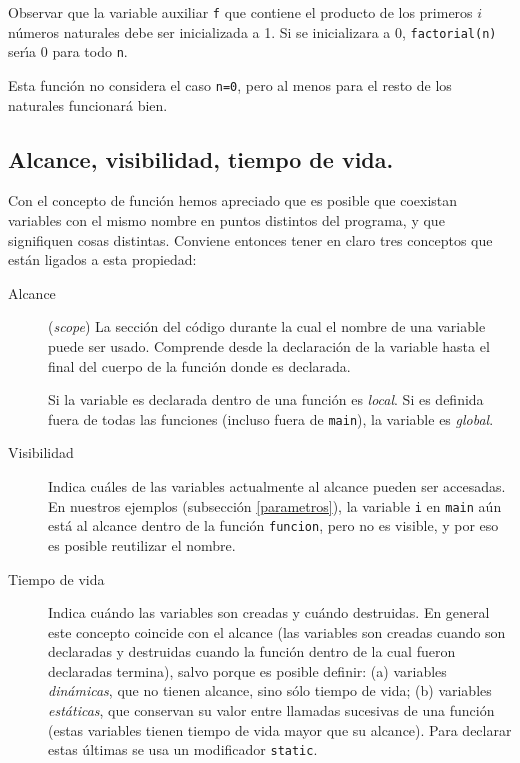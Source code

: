 Observar que la variable auxiliar \verb+f+ que contiene el producto
de los primeros $i$ n\'umeros naturales debe ser inicializada a 1. Si
se inicializara a 0, \verb+factorial(n)+ ser\'{\i}a 0 para todo
\verb+n+. 

Esta funci\'on no considera el caso \verb+n=0+, pero al menos para el
resto de los naturales funcionar\'a bien.



\subsection{Alcance, visibilidad, tiempo de vida.}

Con el concepto de funci{\'o}n hemos apreciado que es posible que
coexistan variables con el mismo nombre  en puntos distintos del
programa, y que signifiquen cosas distintas. Conviene entonces tener
en claro tres conceptos que est{\'a}n ligados a esta propiedad:

\begin{description}
\item[Alcance]  ({\it scope}) La secci{\'o}n del c{\'o}digo durante la cual el
nombre de una variable puede ser usado. Comprende desde la
declaraci{\'o}n de la variable hasta el final del cuerpo de la
funci{\'o}n donde es declarada.

Si la variable es declarada dentro de una funci{\'o}n es {\em local\/}.
Si es definida fuera de todas las funciones (incluso fuera de
\verb+main+), la variable es {\em global}.

\item[Visibilidad] Indica cu{\'a}les de las variables actualmente al
alcance pueden ser accesadas. En nuestros ejemplos (subsecci{\'o}n
\ref{parametros}), la variable \verb+i+ en \verb+main+ a{\'u}n est{\'a} al
alcance dentro de la funci{\'o}n \verb+funcion+, pero no es visible, y
por eso es posible reutilizar el nombre. 

\item[Tiempo de vida] Indica cu{\'a}ndo las variables son creadas y cu{\'a}ndo
  destruidas. En general este concepto coincide con el alcance (las
  variables son creadas cuando son declaradas y destruidas cuando la
  funci{\'o}n dentro de la cual fueron declaradas termina), salvo porque
  es posible definir: (a) variables {\em din{\'a}micas\/}, que no tienen
  alcance, sino s{\'o}lo tiempo de vida; (b) variables {\em est{\'a}ticas\/},
  que conservan su valor entre llamadas sucesivas de una funci{\'o}n
  (estas variables tienen tiempo de vida mayor que su alcance). Para
  declarar estas {\'u}ltimas se usa un modificador \verb|static|. 
\end{description}


